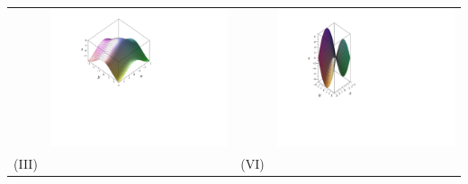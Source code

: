 \documentclass[12pt]{article}
\begin{document}
\begin{enumerate}
\begin{center}
\begin{tabular}{lc|cc}
&\includegraphics[scale=0.5]{matchingd.pdf} && \includegraphics[scale=0.5]{matchinga.pdf}\\
(III)&&(VI)\\

\end{tabular}
\end{center}
\end{enumerate}
\end{document}

